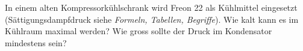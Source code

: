 In einem alten Kompressorkühlschrank wird Freon 22 als Kühlmittel eingesetzt (Sättigungsdampfdruck siehe \emph{Formeln, Tabellen, Begriffe}). Wie kalt kann es im Kühlraum maximal werden? Wie gross sollte der Druck im Kondensator mindestens sein?
